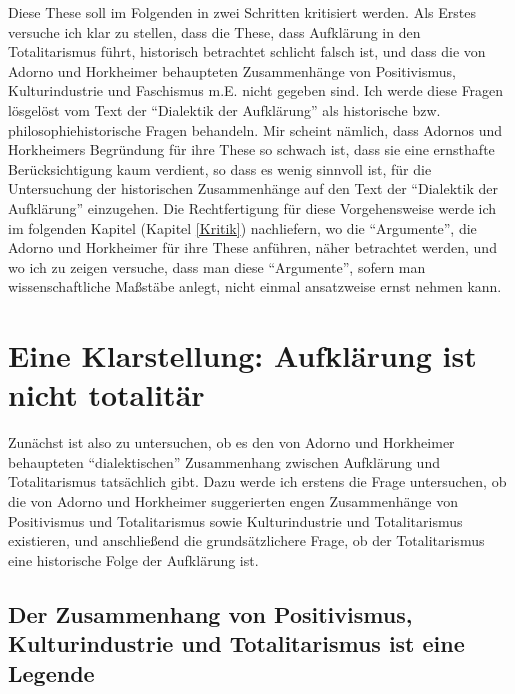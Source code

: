 \documentclass[12pt,a4paper,ngerman]{article}
\begin{document}
Diese These soll im Folgenden in zwei Schritten kritisiert werden. Als
Erstes versuche ich klar zu stellen, dass die These, dass Aufklärung
in den Totalitarismus führt, historisch betrachtet schlicht falsch
ist, und dass die von Adorno und Horkheimer behaupteten Zusammenhänge
von Positivismus, Kulturindustrie und Faschismus m.E. nicht gegeben
sind. Ich werde diese Fragen lösgelöst vom Text der "`Dialektik der
Aufklärung"' als historische bzw. philosophiehistorische Fragen
behandeln. Mir scheint nämlich, dass Adornos und Horkheimers
Begründung für ihre These so schwach ist, dass sie eine ernsthafte
Berücksichtigung kaum verdient, so dass es wenig sinnvoll ist, für die
Untersuchung der historischen Zusammenhänge auf den Text der
"`Dialektik der Aufklärung"' einzugehen. Die Rechtfertigung für diese
Vorgehensweise werde ich im folgenden Kapitel (Kapitel \ref{Kritik})
nachliefern, wo die "`Argumente"', die Adorno und Horkheimer für ihre
These anführen, näher betrachtet werden, und wo ich zu zeigen
versuche, dass man diese "`Argumente"', sofern man wissenschaftliche
Maßstäbe anlegt, nicht einmal ansatzweise ernst nehmen kann.

\section{Eine Klarstellung: Aufklärung ist nicht totalitär}
\label{Klarstellung}

Zunächst ist also zu untersuchen, ob es den von Adorno und Horkheimer
behaupteten "`dialektischen"' Zusammenhang zwischen Aufklärung und
Totalitarismus tatsächlich gibt. Dazu werde ich erstens die Frage untersuchen,
ob die von Adorno und Horkheimer suggerierten engen Zusammenhänge von
Positivismus und Totalitarismus sowie Kulturindustrie und Totalitarismus
existieren, und anschließend die grundsätzlichere Frage, ob der Totalitarismus
eine historische Folge der Aufklärung ist.

\subsection{Der Zusammenhang von Positivismus, Kulturindustrie und
  Totalitarismus ist eine Legende}
\end{document}
